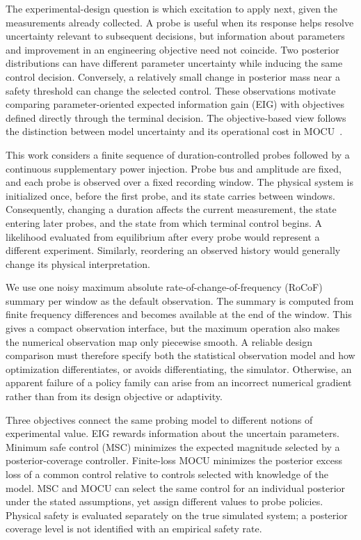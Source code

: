 \documentclass[journal]{IEEEtran}
\begin{document}
The experimental-design question is which excitation to apply next, given the
measurements already collected. A probe is useful when its response helps
resolve uncertainty relevant to subsequent decisions, but information about
parameters and improvement in an engineering objective need not coincide.
Two posterior distributions can have different parameter uncertainty while
inducing the same control decision. Conversely, a relatively small change in
posterior mass near a safety threshold can change the selected control.
These observations motivate comparing parameter-oriented expected information
gain (EIG) with objectives defined directly through the terminal decision.
The objective-based view follows the distinction between model uncertainty
and its operational cost in MOCU~\cite{yoon2013mocu,boluki2018generalized}.

This work considers a finite sequence of duration-controlled probes followed
by a continuous supplementary power injection. Probe bus and amplitude are
fixed, and each probe is observed over a fixed recording window. The physical
system is initialized once, before the first probe, and its state carries
between windows. Consequently, changing a duration affects the current
measurement, the state entering later probes, and the state from which
terminal control begins. A likelihood evaluated from equilibrium after every
probe would represent a different experiment. Similarly, reordering an
observed history would generally change its physical interpretation.

We use one noisy maximum absolute rate-of-change-of-frequency (RoCoF)
summary per window as the default observation. The summary is computed from
finite frequency differences and becomes available at the end of the window.
This gives a compact observation interface, but the maximum operation also
makes the numerical observation map only piecewise smooth. A reliable design
comparison must therefore specify both the statistical observation model and
how optimization differentiates, or avoids differentiating, the simulator.
Otherwise, an apparent failure of a policy family can arise from an incorrect
numerical gradient rather than from its design objective or adaptivity.

Three objectives connect the same probing model to different notions of
experimental value. EIG rewards information about the uncertain parameters.
Minimum safe control (MSC) minimizes the expected magnitude selected by a
posterior-coverage controller. Finite-loss MOCU minimizes the posterior excess
loss of a common control relative to controls selected with knowledge of the
model. MSC and MOCU can select the same control for an individual posterior
under the stated assumptions, yet assign different values to probe policies.
Physical safety is evaluated separately on the true simulated system; a
posterior coverage level is not identified with an empirical safety rate.
\end{document}
